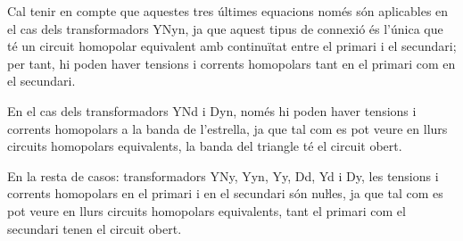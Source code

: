 Cal tenir en compte que aquestes tres últimes equacions  només són aplicables en el cas dels transformadors YNyn, ja que aquest tipus de connexió és l'única que té un circuit homopolar equivalent amb continuïtat entre el primari i el secundari; per tant, hi poden haver tensions i corrents homopolars tant en el primari com en el secundari.

En el cas dels transformadors YNd i Dyn, només hi poden haver tensions i corrents homopolars a la banda de l'estrella, ja que tal com es pot veure en llurs circuits homopolars equivalents, la banda del triangle té el circuit obert.


En la resta de casos: transformadors YNy, Yyn, Yy, Dd, Yd i Dy, les tensions i corrents homopolars en el primari i en el secundari són  nuŀles, ja que tal com es pot veure en llurs circuits homopolars equivalents, tant el primari com el secundari tenen el circuit obert.


